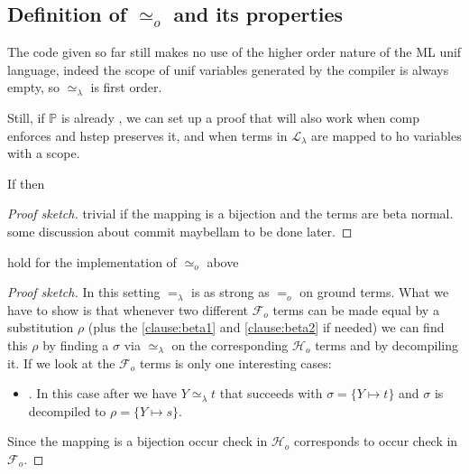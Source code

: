 \documentclass[sigconf,natbib=false,review]{acmart}
\newcommand{\EqualRel}{\ensuremath{=}}
\newcommand{\UnifRel}{\ensuremath{\simeq}}
\newcommand{\Uo}{\ensuremath{\UnifRel_o}\xspace}
\newcommand{\Eo}{\ensuremath{\EqualRel_o}\xspace}
\newcommand{\Ue}{\ensuremath{\UnifRel_\lambda}\xspace}
\newcommand{\Ee}{\ensuremath{\EqualRel_\lambda}\xspace}
\newcommand{\llambda}{\ensuremath{\mathcal{L}_\lambda}\xspace}
\newcommand{\Fo}{\ensuremath{\mathcal{F}_{\!o}\xspace}} %
\newcommand{\Ho}{\ensuremath{\mathcal{H}_o}\xspace}
\newcommand{\foUnifPb}{\ensuremath{\mathbb{P}}\xspace}
\begin{document}
%



% 


% 



\subsection{Definition of \Uo and its properties}\label{sec:founif}



The code given so far still makes no use
of the higher order nature of the ML unif language,
indeed the scope of unif variables generated by the
compiler is always empty, so \Ue{} is first order.

Still, if \foUnifPb is already \wellb, we can set up a proof
that will also work when comp enforces \wellb and  hstep
preserves it, and when terms in \llambda are mapped to ho variables
with a scope.


\begin{lemma} If
   then 
\end{lemma}
\begin{proof}[Proof sketch]
trivial if the mapping is a bijection and 
the terms are beta normal.
some discussion about commit maybellam to be done later.
\end{proof}


\begin{lemma}
 hold for the implementation of \Uo above
\end{lemma}
\begin{proof}[Proof sketch]
 In this setting \Ee is as strong as
\Eo on ground terms. What we have to show is that whenever two different \Fo{}
terms can be made equal by a substitution $\rho$ (plus the \ref{clause:beta1}
and \ref{clause:beta2} if needed) we can find this $\rho$ by finding
a $\sigma$ via \Ue{} on the corresponding \Ho terms and by decompiling it.
If we look at the \Fo{} terms is only one interesting cases:
\begin{itemize}
\item \elpiIn{fuva X ~\Uo~s}. In this case after  we have
  $Y \Ue t$ that succeeds with $\sigma = \{ Y \mapsto t\}$ and
  $\sigma$ is decompiled to $\rho = \{ Y \mapsto s\}$.
\end{itemize}
Since the mapping is a bijection occur check in \Ho{} corresponds to occur
check in \Fo{}.
\end{proof}
\end{document}
